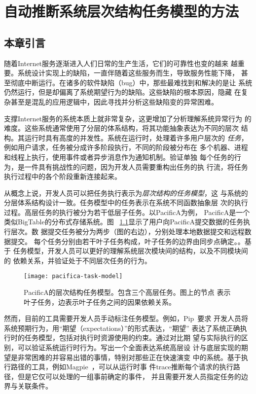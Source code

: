 \chapter{自动推断系统层次结构任务模型的方法}
\label{chap:scalpel}

\section{本章引言}

随着Internet服务逐渐进入人们日常的生产生活，它们的可靠性也变的越来
越重要。系统设计实现上的缺陷，一直伴随着这些服务而生，导致服务性能下降，
甚至彻底中断运行。在诸多的软件缺陷（bug）中，那些最难找到和解决的是让
系统仍然运行，但是却偏离了系统期望行为的缺陷。这些缺陷的根本原因，隐藏
在复杂甚至是混乱的应用逻辑中，因此寻找并分析这些缺陷变的异常困难。

支撑Internet服务的系统本质上就非常复杂，这更增加了分析理解系统异常行为
的难度。这些系统通常使用了分层的体系结构，将其功能抽象表达为不同的层次
结构。其运行时具有高度的并发性。系统在运行时，处理着许多用户层次的
\emph{任务}，例如用户请求，任务被分成许多阶段执行，不同的阶段被分布在
多个机器、进程和线程上执行，使用事件或者异步消息作为通知机制。验证单独
每个任务的行为，是一件具有挑战性的问题，因为开发人员需要重构出任务的执
行流，将任务执行过程中的各个阶段重新连接起来。

从概念上说，开发人员可以把任务执行表示为\emph{层次结构的任务模型}，这
与系统的分层体系结构设计一致。任务模型中的任务表示在系统不同函数抽象层
次的执行过程。高层任务的执行被分为若干低层子任务。以PacificA为例，
PacificA是一个类似BigTable的分布式存储系统。图~
\ref{fig:pacifica_model}显示了用户向PacificA提交数据的任务执行层次。数
据提交任务被分为两步（图的右边），分别处理本地数据提交和远程数据提交。
每个任务分别由若干{叶子任务}构成，叶子任务的边界由{同步点}确定。。基于
任务模型，开发人员可以更好的理解系统层次模块间的结构，以及不同模块间的
依赖关系，并验证处于不同层次任务的行为。

\begin{figure}
  \centering
  \begin{minipage}{0.8\linewidth}
    \centering
    \texttt{[image: pacifica-task-model]}
    \caption{PacificA的层次结构任务模型。包含三个高层任务。图上的节点
    表示叶子任务，边表示叶子任务之间的因果依赖关系。}
    \label{fig:pacifica_model}
  \end{minipage}
\end{figure}

然而，目前的工具需要开发人员手动标注任务模型。例如，Pip~\cite{pip}要求
开发人员将系统预期行为，用“期望（expectations）”的形式表达，“期望”
表达了系统正确执行时的任务模型，包括对执行时资源使用的约束。通过对比期
望与实际执行的区别，可以验证系统运行时行为。写出一个全面表达系统高层设
计与底层实现的期望是非常困难的并容易出错的事情，特别对那些正在快速演变
中的系统。基于执行路径的工具，例如Magpie~\cite{magpie}，可以从运行时事
件trace推断每个请求的执行路径，但是它仅可以处理的一组事前确定的事件，
并且需要开发人员指定任务的边界与关联条件。

